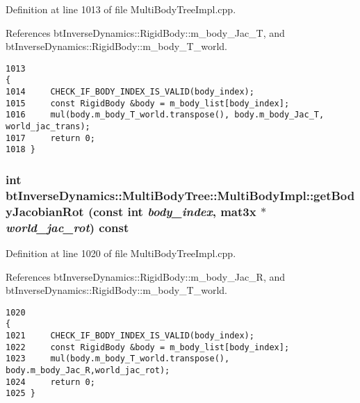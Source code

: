  

Definition at line 1013 of file MultiBodyTreeImpl.cpp.

References btInverseDynamics::RigidBody::m\_\-body\_\-Jac\_\-T, and btInverseDynamics::RigidBody::m\_\-body\_\-T\_\-world.

\begin{Code}\begin{verbatim}1013                                                                                                        {
1014     CHECK_IF_BODY_INDEX_IS_VALID(body_index);
1015     const RigidBody &body = m_body_list[body_index];
1016     mul(body.m_body_T_world.transpose(), body.m_body_Jac_T, world_jac_trans);
1017     return 0;
1018 }
\end{verbatim}
\end{Code}


\hypertarget{classbt_inverse_dynamics_1_1_multi_body_tree_1_1_multi_body_impl_6ad506d2cc78d6184decd005bdabdce7}{
\subsubsection[getBodyJacobianRot]{\setlength{\rightskip}{0pt plus 5cm}int btInverseDynamics::MultiBodyTree::MultiBodyImpl::getBodyJacobianRot (const int {\em body\_\-index}, \/  mat3x $\ast$ {\em world\_\-jac\_\-rot}) const}}
\label{classbt_inverse_dynamics_1_1_multi_body_tree_1_1_multi_body_impl_6ad506d2cc78d6184decd005bdabdce7}


 

Definition at line 1020 of file MultiBodyTreeImpl.cpp.

References btInverseDynamics::RigidBody::m\_\-body\_\-Jac\_\-R, and btInverseDynamics::RigidBody::m\_\-body\_\-T\_\-world.

\begin{Code}\begin{verbatim}1020                                                                                                    {
1021     CHECK_IF_BODY_INDEX_IS_VALID(body_index);
1022     const RigidBody &body = m_body_list[body_index];
1023     mul(body.m_body_T_world.transpose(), body.m_body_Jac_R,world_jac_rot);
1024     return 0;
1025 }
\end{verbatim}
\end{Code}


